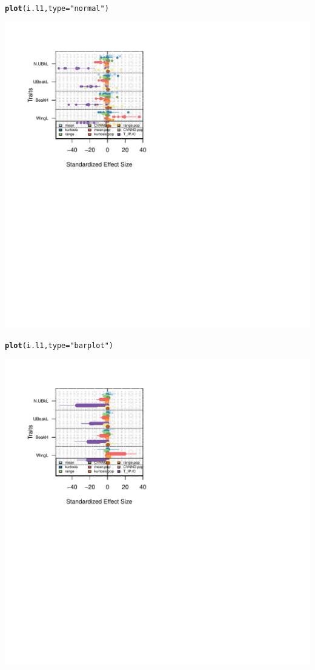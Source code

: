 \documentclass[12pt]{article}\usepackage[]{graphicx}\usepackage[]{color}
\makeatletter
\def\maxwidth{ %
  \ifdim\Gin@nat@width>\linewidth
    \linewidth
  \else
    \Gin@nat@width
  \fi
}
\newcommand{\hlstr}[1]{\textcolor[rgb]{0.192,0.494,0.8}{#1}}%
\newcommand{\hlstd}[1]{\textcolor[rgb]{0.345,0.345,0.345}{#1}}%
\newcommand{\hlkwc}[1]{\textcolor[rgb]{0.333,0.667,0.333}{#1}}%
\newcommand{\hlkwd}[1]{\textcolor[rgb]{0.737,0.353,0.396}{\textbf{#1}}}%
\newenvironment{kframe}{%
 \def\at@end@of@kframe{}%
 \ifinner\ifhmode%
  \def\at@end@of@kframe{\end{minipage}}%
  \begin{minipage}{\columnwidth}%
 \fi\fi%
 \def\FrameCommand##1{\hskip\@totalleftmargin \hskip-\fboxsep
 \colorbox{shadecolor}{##1}\hskip-\fboxsep
     \hskip-\linewidth \hskip-\@totalleftmargin \hskip\columnwidth}%
 \MakeFramed {\advance\hsize-\width
   \@totalleftmargin\z@ \linewidth\hsize
   \@setminipage}}%
 {\par\unskip\endMakeFramed%
 \at@end@of@kframe}
\newenvironment{knitrout}{}{} %
\makeatother
\begin{document}
\begin{knitrout}
\begin{kframe}\begin{alltt}
\hlkwd{plot}\hlstd{(i.l1,}\hlkwc{type}\hlstd{=}\hlstr{"normal"}\hlstd{)}
\end{alltt}
\end{kframe}
\includegraphics[width=\maxwidth]{figure/unnamed-chunk-433} 
\begin{kframe}\begin{alltt}
\hlkwd{plot}\hlstd{(i.l1,}\hlkwc{type}\hlstd{=}\hlstr{"barplot"}\hlstd{)}
\end{alltt}
\end{kframe}
\includegraphics[width=\maxwidth]{figure/unnamed-chunk-434} 

\end{knitrout}
\end{document}
